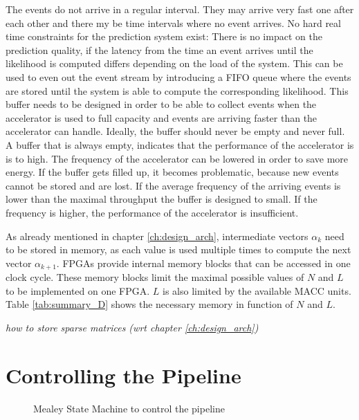 \documentclass[mscthesis]{usiinfthesis}
\begin{document}
The events do not arrive in a regular interval. They may arrive very fast one
after each other and there my be time intervals where no event arrives. No hard
real time constraints for the prediction system exist: There is no impact on
the prediction quality, if the latency from the time an event arrives until the
likelihood is computed differs depending on the load of the system. This can be
used to even out the event stream by introducing a FIFO queue where the events
are stored until the system is able to compute the corresponding likelihood.
This buffer needs to be designed in order to be able to collect events when the
accelerator is used to full capacity and events are arriving faster than the
accelerator can handle. Ideally, the buffer should never be empty and never
full. A buffer that is always empty, indicates that the performance of the
accelerator is is to high. The frequency of the accelerator can be lowered in
order to save more energy. If the buffer gets filled up, it becomes
problematic, because new events cannot be stored and are lost. If the average
frequency of the arriving events is lower than the maximal throughput the
buffer is designed to small.  If the frequency is higher, the performance of
the accelerator is insufficient.

As already mentioned in chapter \ref{ch:design_arch}, intermediate vectors 
$\alpha_k$ need to be stored in memory, as each value is used multiple times to
compute the next vector $\alpha_{k+1}$. FPGAs provide internal memory blocks
that can be accessed in one clock cycle. These memory blocks limit the maximal
possible values of $N$ and $L$ to be implemented on one FPGA. $L$ is also
limited by the available MACC units. Table \ref{tab:summary_D} shows the
necessary memory in function of $N$ and $L$.

\emph{\color{red}how to store sparse matrices (wrt chapter
\ref{ch:design_arch})}

\section{Controlling the Pipeline}
\label{ch:design_ctrl}

\begin{figure}
    \centering
    
    \caption{Mealey State Machine to control the pipeline}
    \label{fig:arch_sm}
\end{figure}
\end{document}
